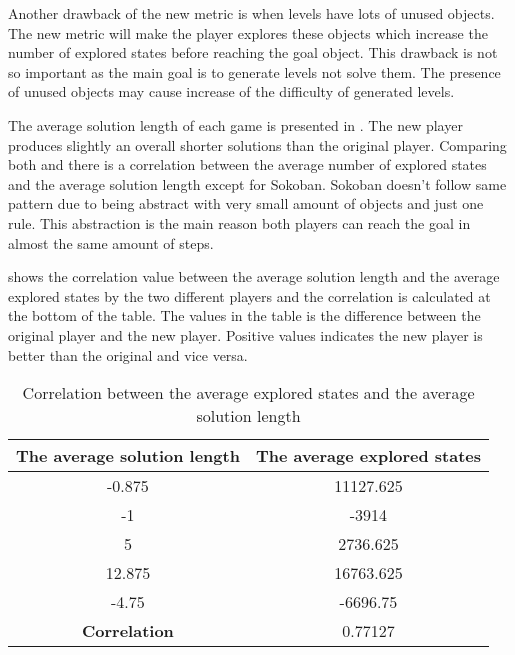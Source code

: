 
Another drawback of the new metric is when levels have lots of unused objects. The new metric will make the player explores these objects which increase the number of explored states before reaching the goal object. This drawback is not so important as the main goal is to generate levels not solve them. The presence of unused objects may cause increase of the difficulty of generated levels.\\\par

The average solution length of each game is presented in . The new player produces slightly an overall shorter solutions than the original player. Comparing both  and  there is a correlation between the average number of explored states and the average solution length except for Sokoban. Sokoban doesn't follow same pattern due to being abstract with very small amount of objects and just one rule. This abstraction is the main reason both players can reach the goal in almost the same amount of steps.


 shows the correlation value between the average solution length and the average explored states by the two different players and the correlation is calculated at the bottom of the table. The values in the table is the difference between the original player and the new player. Positive values indicates the new player is better than the original and vice versa.

\begin{table}[!ht]
	\centering
	\begin{tabular}{|c|c|}
		\hline
		\textbf{The average solution length} & \textbf{The average explored states}\\
		\hline
		-0.875 & 11127.625\\
		\hline
		-1 & -3914\\
		\hline
		5 & 2736.625\\
		\hline
		12.875 & 16763.625\\
		\hline
		-4.75 & -6696.75\\
		\hline
		\textbf{Correlation} & 0.77127\\
		\hline
	\end{tabular}
	\caption{Correlation between the average explored states and the average solution length}
	\label{Table:playerCorrelation}
\end{table}

